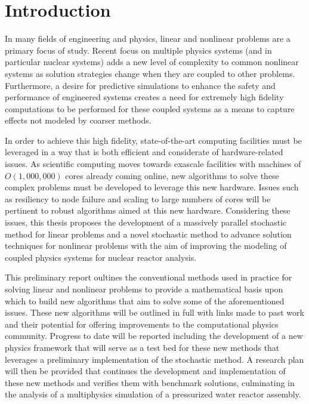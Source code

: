 \chapter{Introduction}
\label{ch:introduction}

In many fields of engineering and physics, linear and nonlinear
problems are a primary focus of study. Recent focus on multiple
physics systems (and in particular nuclear systems) adds a new level
of complexity to common nonlinear systems as solution strategies
change when they are coupled to other problems. Furthermore, a desire
for predictive simulations to enhance the safety and performance of
engineered systems creates a need for extremely high fidelity
computations to be performed for these coupled systems as a means to
capture effects not modeled by coarser methods.

In order to achieve this high fidelity, state-of-the-art computing
facilities must be leveraged in a way that is both efficient and
considerate of hardware-related issues. As scientific computing moves
towards exascale facilities with machines of $O(1,000,000)$ cores
already coming online, new algorithms to solve these complex problems
must be developed to leverage this new hardware. Issues such as
resiliency to node failure and scaling to large numbers of cores will
be pertinent to robust algorithms aimed at this new
hardware. Considering these issues, this thesis proposes the
development of a massively parallel stochastic method for linear
problems and a novel stochastic method to advance solution techniques
for nonlinear problems with the aim of improving the modeling of
coupled physics systems for nuclear reactor analysis.

This preliminary report oultines the conventional methods used in
practice for solving linear and nonlinear problems to provide a
mathematical basis upon which to build new algorithms that aim to
solve some of the aforementioned issues. These new algorithms will be
outlined in full with links made to past work and their potential for
offering improvements to the computational physics community. Progress
to date will be reported including the development of a new physics
framework that will serve as a test bed for these new methods that
leverages a preliminary implementation of the stochastic method. A
research plan will then be provided that continues the development and
implementation of these new methods and verifies them with benchmark
solutions, culminating in the analysis of a multiphysics simulation of
a pressurized water reactor assembly.

